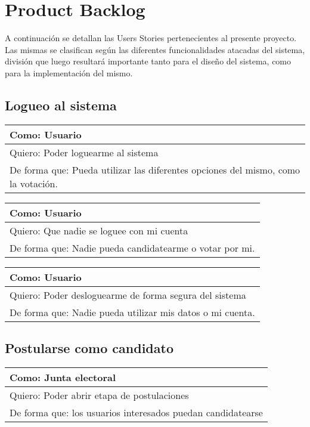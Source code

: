 \section{Product Backlog}


A continuaci\'on se detallan las Users Stories pertenecientes al presente proyecto.
Las mismas se clasifican seg\'un las diferentes funcionalidades atacadas del sistema, divisi\'on que luego resultar\'a importante tanto para el dise\~{n}o del sistema, como para la implementaci\'on del mismo.

\subsection{Logueo al sistema}


\bigskip

\begin{tabular}{|l|}
\hline
Como: Usuario\\
\hline
Quiero: Poder loguearme al sistema\\
\hline
De forma que: Pueda utilizar las diferentes opciones del mismo, como la votaci\'on. \\
\hline
\end{tabular}

\bigskip

\begin{tabular}{|l|}
\hline
Como: Usuario\\
\hline
Quiero: Que nadie se loguee con mi cuenta\\
\hline
De forma que: Nadie pueda candidatearme o votar por mi. \\
\hline
\end{tabular}



\bigskip

\begin{tabular}{|l|}
\hline
Como: Usuario\\
\hline
Quiero: Poder desloguearme de forma segura del sistema\\
\hline
De forma que: Nadie pueda utilizar mis datos o mi cuenta.\\
\hline
\end{tabular}


\bigskip


\subsection{Postularse como candidato}

\begin{tabular}{|l|}
\hline
Como: Junta electoral\\
\hline
Quiero: Poder abrir etapa de postulaciones\\
\hline
De forma que: los usuarios interesados puedan candidatearse \\
\hline
\end{tabular}

